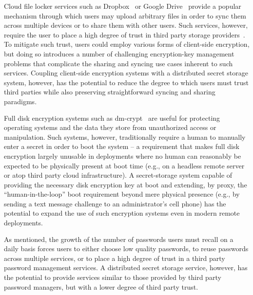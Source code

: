 \begin{packed_desc}
\item[Encrypted File Lockers:] Cloud file locker services such as
  Dropbox~\cite{dropbox} or Google Drive~\cite{google-drive} provide a
  popular mechanism through which users may upload arbitrary files in
  order to sync them across multiple devices or to share them with
  other users. Such services, however, require the user to place a
  high degree of trust in third party storage
  providers~\cite{sayler-trust}. To mitigate such trust, users could
  employ various forms of client-side encryption, but doing so
  introduces a number of challenging encryption-key management
  problems that complicate the sharing and syncing use cases inherent
  to such services. Coupling client-side encryption systems with a
  distributed secret storage system, however, has the potential to
  reduce the degree to which users must trust third parties while also
  preserving straightforward syncing and sharing paradigms.
\item[Datacenter Disk Encryption:] Full disk encryption systems such
  as dm-crypt~\cite{dm-crypt} are useful for protecting operating
  systems and the data they store from unauthorized access or
  manipulation. Such systems, however, traditionally require a human
  to manually enter a secret in order to boot the system -- a
  requirement that makes full disk encryption largely unusable in
  deployments where no human can reasonably be expected to be
  physically present at boot time (e.g., on a headless remote server
  or atop third party cloud infrastructure). A secret-storage system
  capable of providing the necessary disk encryption key at boot and
  extending, by proxy, the ``human-in-the-loop'' boot requirement
  beyond mere physical presence (e.g., by sending a text message
  challenge to an administrator's cell phone) has the potential to
  expand the use of such encryption systems even in modern remote
  deployments.
\item[Password Management:] As mentioned, the growth of the number of
  passwords users must recall on a daily basis forces users to either
  choose low quality passwords, to reuse passwords across multiple
  services, or to place a high degree of trust in a third party
  password management services. A distributed secret storage service,
  however, has the potential to provide services similar to those
  provided by third party password managers, but with a lower degree
  of third party trust.
\end{packed_desc}


